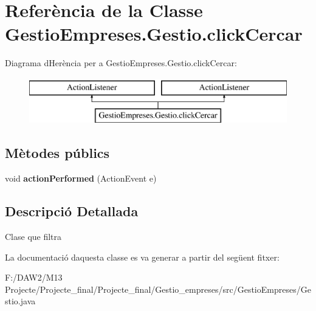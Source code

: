 \hypertarget{class_gestio_empreses_1_1_gestio_1_1click_cercar}{}\section{Referència de la Classe Gestio\+Empreses.\+Gestio.\+click\+Cercar}
\label{class_gestio_empreses_1_1_gestio_1_1click_cercar}
Diagrama d\textquotesingle{}Herència per a Gestio\+Empreses.\+Gestio.\+click\+Cercar\+:\begin{figure}[H]
\begin{center}
\leavevmode
\includegraphics[height=2.000000cm]{class_gestio_empreses_1_1_gestio_1_1click_cercar}
\end{center}
\end{figure}
\subsection*{Mètodes públics}
\begin{DoxyCompactItemize}
\item 
\mbox{\label{class_gestio_empreses_1_1_gestio_1_1click_cercar_a1cf8698b479518e017048bd31a62305c}} 
void {\bfseries action\+Performed} (Action\+Event e)
\end{DoxyCompactItemize}


\subsection{Descripció Detallada}
Clase que filtra 

La documentació d\textquotesingle{}aquesta classe es va generar a partir del següent fitxer\+:\begin{DoxyCompactItemize}
\item 
F\+:/\+D\+A\+W2/\+M13 Projecte/\+Projecte\+\_\+final/\+Projecte\+\_\+final/\+Gestio\+\_\+empreses/src/\+Gestio\+Empreses/Gestio.\+java\end{DoxyCompactItemize}
